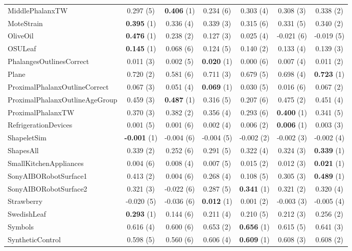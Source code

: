 \begin{table}[ht]
\begin{adjustbox}{width=\textwidth}
\begin{tabular}{lcccccc}
MiddlePhalanxTW & 0.297 (5) & \textbf{0.406} (1) & 0.234 (6) & 0.303 (4) & 0.308 (3) & 0.338 (2) \\
MoteStrain & \textbf{0.395} (1) & 0.336 (4) & 0.339 (3) & 0.315 (6) & 0.331 (5) & 0.340 (2) \\
OliveOil & \textbf{0.476} (1) & 0.238 (2) & 0.127 (3) & 0.025 (4) & -0.021 (6) & -0.019 (5) \\
OSULeaf & \textbf{0.145} (1) & 0.068 (6) & 0.124 (5) & 0.140 (2) & 0.133 (4) & 0.139 (3) \\
PhalangesOutlinesCorrect & 0.011 (3) & 0.002 (5) & \textbf{0.020} (1) & 0.000 (6) & 0.007 (4) & 0.011 (2) \\
Plane & 0.720 (2) & 0.581 (6) & 0.711 (3) & 0.679 (5) & 0.698 (4) & \textbf{0.723} (1) \\
ProximalPhalanxOutlineCorrect & 0.067 (3) & 0.051 (4) & \textbf{0.069} (1) & 0.030 (5) & 0.016 (6) & 0.067 (2) \\
ProximalPhalanxOutlineAgeGroup & 0.459 (3) & \textbf{0.487} (1) & 0.316 (5) & 0.207 (6) & 0.475 (2) & 0.451 (4) \\
ProximalPhalanxTW & 0.370 (3) & 0.382 (2) & 0.356 (4) & 0.293 (6) & \textbf{0.400} (1) & 0.341 (5) \\
RefrigerationDevices & 0.001 (5) & 0.001 (6) & 0.002 (4) & 0.006 (2) & \textbf{0.006} (1) & 0.003 (3) \\
ShapeletSim & \textbf{-0.001} (1) & -0.004 (6) & -0.004 (5) & -0.002 (2) & -0.002 (3) & -0.002 (4) \\
ShapesAll & 0.339 (2) & 0.252 (6) & 0.291 (5) & 0.322 (4) & 0.324 (3) & \textbf{0.339} (1) \\
SmallKitchenAppliances & 0.004 (6) & 0.008 (4) & 0.007 (5) & 0.015 (2) & 0.012 (3) & \textbf{0.021} (1) \\
SonyAIBORobotSurface1 & 0.413 (2) & 0.004 (6) & 0.268 (4) & 0.108 (5) & 0.305 (3) & \textbf{0.489} (1) \\
SonyAIBORobotSurface2 & 0.321 (3) & -0.022 (6) & 0.287 (5) & \textbf{0.341} (1) & 0.321 (2) & 0.320 (4) \\
Strawberry & -0.020 (5) & -0.036 (6) & \textbf{0.012} (1) & 0.001 (2) & -0.003 (3) & -0.005 (4) \\
SwedishLeaf & \textbf{0.293} (1) & 0.144 (6) & 0.211 (4) & 0.210 (5) & 0.212 (3) & 0.256 (2) \\
Symbols & 0.616 (4) & 0.600 (6) & 0.653 (2) & \textbf{0.656} (1) & 0.615 (5) & 0.641 (3) \\
SyntheticControl & 0.598 (5) & 0.560 (6) & 0.606 (4) & \textbf{0.609} (1) & 0.608 (3) & 0.608 (2) \\

\end{tabular}
\end{adjustbox}
\end{table}
